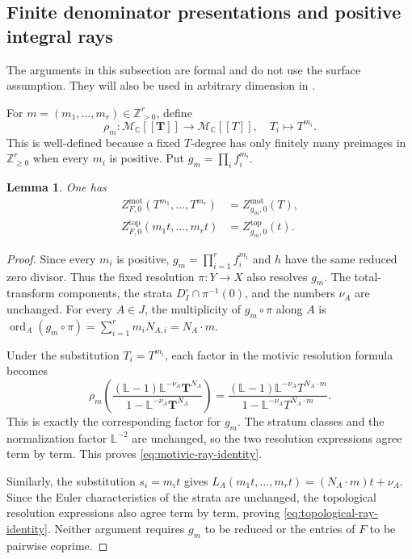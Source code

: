 \documentclass[12pt]{amsart}
\numberwithin{equation}{section}
\theoremstyle{plain}
\newtheorem{lemma}[theorem]{Lemma}
\theoremstyle{definition}
\theoremstyle{remark}
\theoremstyle{definition}
\DeclareMathOperator{\ord}{ord}
\newcommand{\Z}{\mathbb Z}
\newcommand{\Mmot}{\mathcal M_{\mathbb C}}
\newcommand{\motzeta}{Z^{\mathrm{mot}}_{F,0}}
\begin{document}
\subsection{Finite denominator presentations and positive integral rays}

The arguments in this subsection are formal and do not use the surface assumption. They will also be used in arbitrary dimension in .

For $m=(m_1,\ldots,m_r)\in\Z_{>0}^r$, define
\begin{equation*}
\rho_m:\Mmot[\![\mathbf T]\!]\to \Mmot[\![T]\!],
 \quad T_i\mapsto  T^{m_i}.
\end{equation*}
This is well-defined because a fixed $T$-degree has only finitely many preimages in $\Z_{\geq0}^r$ when every $m_i$ is positive. Put $g_m=\prod_i f_i^{m_i}$.

\begin{lemma}\label{lem:motivic-ray-identities}
One has
\begin{align}
 \motzeta(T^{m_1},\ldots,T^{m_r})&=Z^{\mathrm{mot}}_{g_m,0}(T),\label{eq:motivic-ray-identity}\\
 Z^{\mathrm{top}}_{F,0}(m_1t,\ldots,m_rt)&=Z^{\mathrm{top}}_{g_m,0}(t).\label{eq:topological-ray-identity}
\end{align}
\end{lemma}

\begin{proof}
Since every $m_i$ is positive, $g_m=\prod_{i=1}^r f_i^{m_i}$ and $h$ have the same reduced zero divisor. Thus the fixed resolution $\pi:Y\to X$ also resolves $g_m$. The total-transform components, the strata $D_I^\circ\cap\pi^{-1}(0)$, and the numbers $\nu_A$ are unchanged. For every $A\in J$, the multiplicity of $g_m\circ\pi$ along $A$ is $\ord_A(g_m\circ\pi)=\sum_{i=1}^r m_iN_{A,i}=N_A\cdot m$.

Under the substitution $T_i=T^{m_i}$, each factor in the motivic resolution formula becomes
\[
\rho_m\left(\frac{(\mathbb L-1)\mathbb L^{-\nu_A}\mathbf T^{N_A}}{1-\mathbb L^{-\nu_A}\mathbf T^{N_A}}\right)
=
\frac{(\mathbb L-1)\mathbb L^{-\nu_A}T^{N_A\cdot m}}{1-\mathbb L^{-\nu_A}T^{N_A\cdot m}}.
\]
This is exactly the corresponding factor for $g_m$. The stratum classes and the normalization factor $\mathbb L^{-2}$ are unchanged, so the two resolution expressions agree term by term. This proves \eqref{eq:motivic-ray-identity}.

Similarly, the substitution $s_i=m_it$ gives $L_A(m_1t,\ldots,m_rt)=(N_A\cdot m)t+\nu_A$. Since the Euler characteristics of the strata are unchanged, the topological resolution expressions also agree term by term, proving \eqref{eq:topological-ray-identity}. Neither argument requires $g_m$ to be reduced or the entries of $F$ to be pairwise coprime.
\end{proof}
\end{document}
